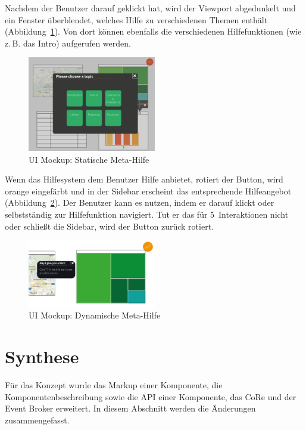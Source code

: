 \documentclass[
	headsepline,
	footsepline,
	fontsize=12pt,
	bibliography=totoc
]{scrbook}
\begin{document}
Nachdem der Benutzer darauf geklickt hat, wird der Viewport abgedunkelt und ein Fenster überblendet, welches Hilfe zu verschiedenen Themen enthält (Abbildung~\ref{figure:meta-step2}). Von dort können ebenfalls die verschiedenen Hilfefunktionen (wie z.\,B. das Intro) aufgerufen werden.

\begin{figure}[htbp]
   \centering
   \includegraphics[width=0.5\textwidth]{images/konzeption-meta-step2.png}
   \caption{UI Mockup: Statische Meta-Hilfe}
   \label{figure:meta-step2}
\end{figure}

Wenn das Hilfesystem dem Benutzer Hilfe anbietet, rotiert der Button, wird orange eingefärbt und in der Sidebar erscheint das entsprechende Hilfeangebot (Abbildung~\ref{figure:meta-dyn}). Der Benutzer kann es nutzen, indem er darauf klickt oder selbstständig zur Hilfefunktion navigiert. Tut er das für 5~Interaktionen nicht oder schließt die Sidebar, wird der Button zurück rotiert. 

\begin{figure}[htbp]
   \centering
   \includegraphics[width=0.5\textwidth]{images/konzeption-meta-dyn.png}
   \caption{UI Mockup: Dynamische Meta-Hilfe}
   \label{figure:meta-dyn}
\end{figure}

\section{Synthese}
\label{section:konzeption:synthese}

Für das Konzept wurde das Markup einer Komponente, die Komponentenbeschreibung sowie die API einer Komponente, das CoRe und der Event Broker erweitert. In diesem Abschnitt werden die Änderungen zusammengefasst.
\end{document}
